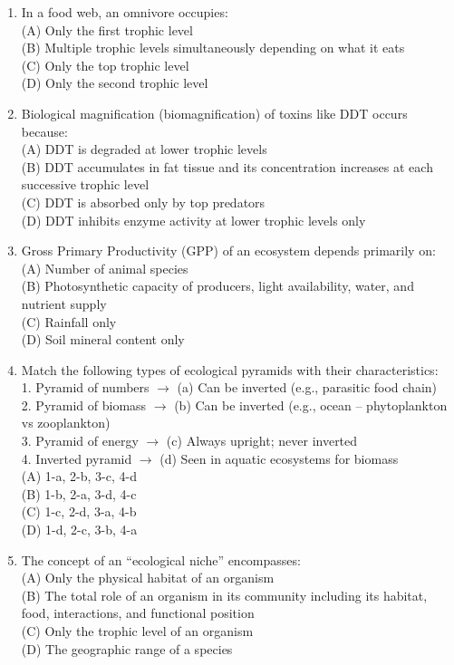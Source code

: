 \documentclass{article}
\begin{document}
\begin{enumerate}[label=Q\arabic*.]
\item In a food web, an omnivore occupies:
\\(A) Only the first trophic level
\\(B) Multiple trophic levels simultaneously depending on what it eats
\\(C) Only the top trophic level
\\(D) Only the second trophic level

\item Biological magnification (biomagnification) of toxins like DDT occurs because:
\\(A) DDT is degraded at lower trophic levels
\\(B) DDT accumulates in fat tissue and its concentration increases at each successive trophic level
\\(C) DDT is absorbed only by top predators
\\(D) DDT inhibits enzyme activity at lower trophic levels only

\item Gross Primary Productivity (GPP) of an ecosystem depends primarily on:
\\(A) Number of animal species
\\(B) Photosynthetic capacity of producers, light availability, water, and nutrient supply
\\(C) Rainfall only
\\(D) Soil mineral content only

\item Match the following types of ecological pyramids with their characteristics:\\
1. Pyramid of numbers $\rightarrow$ (a) Can be inverted (e.g., parasitic food chain)\\
2. Pyramid of biomass $\rightarrow$ (b) Can be inverted (e.g., ocean -- phytoplankton vs zooplankton)\\
3. Pyramid of energy $\rightarrow$ (c) Always upright; never inverted\\
4. Inverted pyramid $\rightarrow$ (d) Seen in aquatic ecosystems for biomass
\\(A) 1-a, 2-b, 3-c, 4-d
\\(B) 1-b, 2-a, 3-d, 4-c
\\(C) 1-c, 2-d, 3-a, 4-b
\\(D) 1-d, 2-c, 3-b, 4-a

\item The concept of an ``ecological niche'' encompasses:
\\(A) Only the physical habitat of an organism
\\(B) The total role of an organism in its community including its habitat, food, interactions, and functional position
\\(C) Only the trophic level of an organism
\\(D) The geographic range of a species

\end{enumerate}
\end{document}
